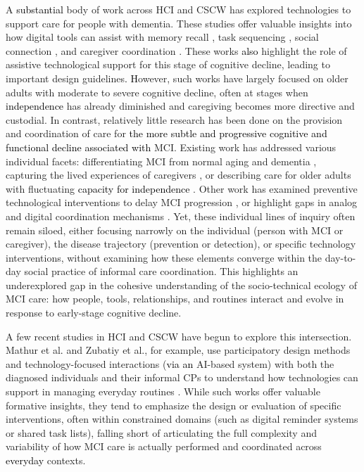 \documentclass[acmsmall]{acmart}
\begin{document}
A \textcolor{black}{substantial} body of work across HCI and CSCW has explored technologies to support care for people with dementia. These studies offer valuable insights into how digital tools can assist with memory recall \cite{alm2002designing}, task sequencing \cite{zaccarelli2013computer}, social connection \cite{kuwahara2006networked}, and caregiver coordination \cite{johnson2020roles, devries2019impact}. These works \textcolor{black}{also} highlight the role of assistive technological support for this stage of cognitive decline, leading to important design guidelines\textcolor{black}{. H}owever, such works have largely focused on older adults with moderate to severe cognitive decline, often at stages when \textcolor{black}{independence} has already diminished and caregiving becomes more directive and custodial. In contrast, relatively little research has been done on the provision and coordination of care for \textcolor{black}{the more subtle and progressive cognitive and functional decline associated with} MCI. Existing work has addressed various individual facets: differentiating MCI from normal aging and dementia \cite{lydon2022integrative}, capturing the lived experiences of caregivers \cite{lara2019functional}, or describing care for older adults with fluctuating \textcolor{black}{capacity for independence} \cite{corbin1985managing, lazar2018negotiating, schurgin2021isolation}. Other work has examined preventive technological interventions to delay MCI progression \cite{yang2022magic}, or highlight gaps in analog and digital coordination mechanisms \cite{smriti2024emotion}. Yet, these individual lines of inquiry often remain siloed, either focusing narrowly on the individual (person with MCI or caregiver), the disease trajectory (prevention or detection), or specific technology interventions, without examining how these elements converge within the day-to-day social practice of informal care coordination. This highlights an underexplored gap in the cohesive understanding of the socio-technical ecology of MCI care: how people, tools, relationships, and routines interact and evolve in response to early-stage cognitive decline.

A few recent studies in HCI and CSCW have begun to explore this intersection. Mathur et al\textcolor{black}{.} and Zubatiy et al\textcolor{black}{.}, for example, use participatory design methods and technology-focused interactions (\textcolor{black}{via an} AI-based system) with both the diagnosed individuals and their informal CPs to understand how technologies can support in managing everyday routines \cite{zubatiy2021empowering, zubatiy2023don, mathur2022collaborative}. While such works offer valuable formative insights, they tend to emphasize the design or evaluation of specific interventions, often within constrained domains (such as digital reminder systems or shared task lists), falling short of articulating the full complexity and variability of how MCI care is actually performed and coordinated across \textcolor{black}{everyday} contexts. 
\end{document}
